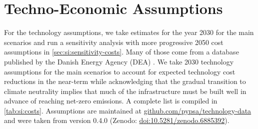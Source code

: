 




\section{Techno-Economic Assumptions}
\label{sec:si:costs}

For the technology assumptions, we take estimates for the year 2030 for the main
scenarios and run a sensitivity analysis with more progressive 2050 cost
assumptions in \cref{sec:si:sensitivity-costs}.  Many of those come from a
database published by the Danish Energy Agency (DEA) . We take 2030
technology assumptions for the main scenarios to account for expected technology
cost reductions in the near-term while acknowledging that the gradual transition
to climate neutrality implies that much of the infrastructure must be built well
in advance of reaching net-zero emissions. A complete list is compiled in
\cref{tab:si:costs}. Assumptions are maintained at
\href{https://github.com/pypsa/technology-data}{github.com/pypsa/technology-data}
and were taken from version 0.4.0 (Zenodo:
\href{https://doi.org/10.5281/zenodo.6885392}{doi:10.5281/zenodo.6885392}).


\begin{tiny}

\end{tiny}

\restoregeometry